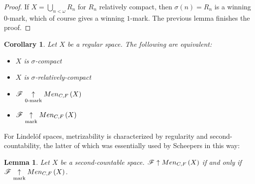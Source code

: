 \documentclass{amsart}
\newtheorem{lemma}[theorem]{Lemma}
\newtheorem{corollary}[theorem]{Corollary}
\theoremstyle{definition}
\begin{document}
\begin{proof}
  If \(X=\bigcup_{n<\omega} R_n\) for \(R_n\) relatively compact, then
  \(\sigma(n)=R_n\) is a winning \(0\)-mark, which of course gives a
  winning \(1\)-mark. The previous lemma finishes the proof.
\end{proof}

\begin{corollary}
  Let \(X\) be a regular space. The following are equivalent:
  \begin{itemize}
    \item \(X\) is \(\sigma\)-compact
    \item \(X\) is \(\sigma\)-relatively-compact
    \item \(\mathscr{F} \underset{0\text{-mark}}{\uparrow} Men_{C,F}\left({X}\right)\)
    \item \(\mathscr{F} \underset{\text{mark}}{\uparrow} Men_{C,F}\left({X}\right)\)
  \end{itemize}
\end{corollary}

For Lindel\"of spaces, metrizability is characterized by regularity and
second-countability, the latter of which was essentially used by Scheepers in
this way:

\begin{lemma}
  Let \(X\) be a second-countable space. \(\mathscr{F}\uparrow Men_{C,F}\left({X}\right)\) if and only if
  \(\mathscr{F}\underset{\text{mark}}{\uparrow}Men_{C,F}\left({X}\right)\).
\end{lemma}
\end{document}
